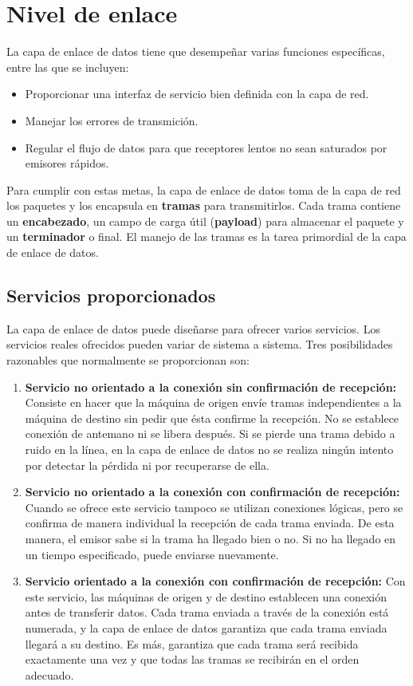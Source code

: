 \section{Nivel de enlace}
La capa de enlace de datos tiene que desempeñar varias funciones específicas, entre las que
se incluyen:
\begin{itemize}
  \item Proporcionar una interfaz de servicio bien definida con la capa de red.
  \item Manejar los errores de transmición.
  \item Regular el flujo de datos para que receptores lentos no sean saturados por emisores rápidos.
\end{itemize}
Para cumplir con estas metas, la capa de enlace de datos toma de la capa de red los paquetes y los encapsula en \textbf{tramas} para transmitirlos. Cada trama contiene un \textbf{encabezado}, un campo de carga útil (\textbf{payload}) para almacenar el paquete y un \textbf{terminador} o final. El manejo de las tramas es la tarea primordial de la capa de enlace de datos.

\subsection{Servicios proporcionados}
La capa de enlace de datos puede diseñarse para ofrecer varios servicios. Los servicios reales
ofrecidos pueden variar de sistema a sistema. Tres posibilidades razonables que normalmente se
proporcionan son:
\begin{enumerate}
  \item \textbf{Servicio no orientado a la conexión sin confirmación de recepción:} Consiste en hacer que la máquina de origen envíe tramas independientes a la máquina de destino sin pedir que ésta confirme la recepción. No se establece conexión de antemano ni se libera después. Si se pierde una trama debido a ruido en la línea, en la capa de enlace de datos no se realiza ningún intento por detectar la pérdida ni por recuperarse de ella.
  \item \textbf{Servicio no orientado a la conexión con confirmación de recepción:} Cuando se ofrece este servicio tampoco se utilizan conexiones lógicas, pero se confirma de manera individual la recepción de cada trama enviada. De esta manera, el emisor sabe si la trama ha llegado bien o no. Si no ha llegado en un tiempo especificado, puede enviarse nuevamente.
  \item \textbf{Servicio orientado a la conexión con confirmación de recepción:} Con este servicio, las máquinas de origen y de destino establecen una conexión antes de transferir datos. Cada trama enviada a través de la conexión está numerada, y la capa de enlace de datos garantiza que cada trama enviada llegará a su destino. Es más, garantiza que cada trama será recibida exactamente una vez y que todas las tramas se recibirán en el orden adecuado.
\end{enumerate}

